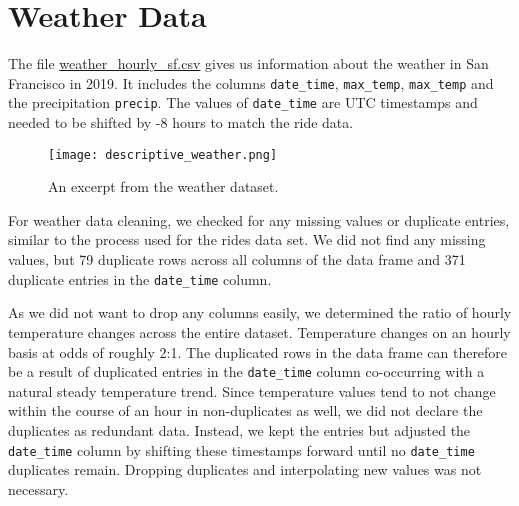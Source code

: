 \section{Weather Data}
The file \href{run:../../data/weather_hourly_sf.csv}{weather\_hourly\_sf.csv} gives us information about the weather in San Francisco in 2019. It includes the columns \texttt{date\_time}, \texttt{max\_temp}, \texttt{max\_temp} and the precipitation \texttt{precip}. The values of \texttt{date\_time} are UTC timestamps and needed to be shifted by -8 hours to match the ride data.

\begin{figure}[h]
    \texttt{[image: descriptive\_weather.png]}
    \caption{An excerpt from the weather dataset.}
\end{figure}

For weather data cleaning, we checked for any missing values or duplicate entries, similar to the process used for the rides data set. We did not find any missing values, but 79 duplicate rows across all columns of the data frame and 371 duplicate entries in the \texttt{date\_time} column.

As we did not want to drop any columns easily, we determined the ratio of hourly temperature changes across the entire dataset. Temperature changes on an hourly basis at odds of roughly 2:1. The duplicated rows in the data frame can therefore be a result of duplicated entries in the \texttt{date\_time} column co-occurring with a natural steady temperature trend.
Since temperature values tend to not change within the course of an hour in non-duplicates as well, we did not declare the duplicates as redundant data. Instead, we kept the entries but adjusted the \texttt{date\_time} column by shifting these timestamps forward until no \texttt{date\_time} duplicates remain. Dropping duplicates and interpolating new values was not necessary.